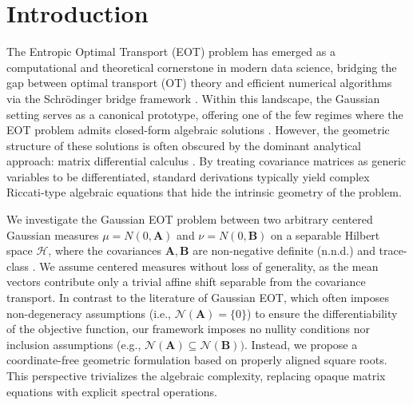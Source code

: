 \documentclass[noinfoline]{imsart}\setcounter{tocdepth}{2}
\newcommand{\m}[1]{\mathbf{#1}}
\renewcommand{\c}[1]{\mathcal{#1}}
\theoremstyle{plain}
\begin{document}
\maketitle

\section{Introduction}
The Entropic Optimal Transport (EOT) problem has emerged as a computational and theoretical cornerstone in modern data science, bridging the gap between optimal transport (OT) theory and efficient numerical algorithms via the Schr\"{o}dinger bridge framework \cite{leonard2012schrodinger, chen2021optimal, peyre2019computational}. Within this landscape, the Gaussian setting serves as a canonical prototype, offering one of the few regimes where the EOT problem admits closed-form algebraic solutions \cite{janati2020entropic}. However, the geometric structure of these solutions is often obscured by the dominant analytical approach: matrix differential calculus \cite{janati2020entropic, mallasto2022entropy, minh2023entropic, bunne2023schrodinger, freulon2025entropic}. By treating covariance matrices as generic variables to be differentiated, standard derivations typically yield complex Riccati-type algebraic equations that hide the intrinsic geometry of the problem.

We investigate the Gaussian EOT problem between two arbitrary centered Gaussian measures $\mu = N(0, \m{A})$ and $\nu = N(0, \m{B})$ on a separable Hilbert space $\c{H}$, where the covariances $\m{A}, \m{B}$ are non-negative definite (n.n.d.) and trace-class \cite{da2006introduction}. We assume centered measures without loss of generality, as the mean vectors contribute only a trivial affine shift separable from the covariance transport. In contrast to the literature of Gaussian EOT, which often imposes non-degeneracy assumptions (i.e., $\c{N}(\m{A})=\{0\}$) to ensure the differentiability of the objective function, our framework imposes no nullity conditions nor inclusion assumptions (e.g., $\c{N}(\m{A}) \subseteq \c{N}(\m{B}))$. Instead, we propose a coordinate-free geometric formulation based on properly aligned square roots. This perspective trivializes the algebraic complexity, replacing opaque matrix equations with explicit spectral operations.
\end{document}
